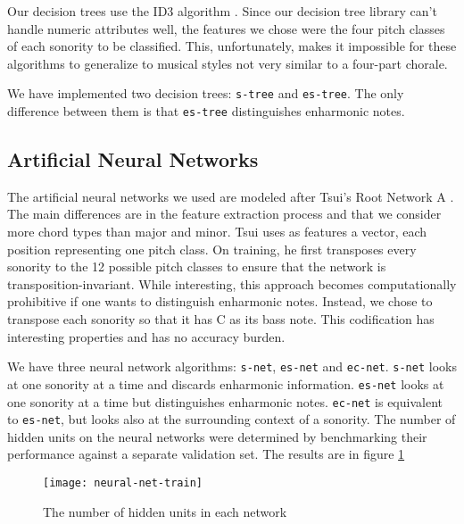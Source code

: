 \documentclass{article}
\newcommand{\comment}[1]{}
\begin{document}
Our decision trees use the ID3 algorithm
\cite{mitchell:machine}. Since our decision tree library can't handle
numeric attributes well, the features we chose were the four pitch
classes of each sonority to be classified. This, unfortunately,
makes it impossible for these algorithms to generalize to musical
styles not very similar to a four-part chorale.

We have implemented two decision trees: \texttt{s-tree} and
\texttt{es-tree}. The only difference between them is that
\texttt{es-tree} distinguishes enharmonic notes.

\subsection{Artificial Neural Networks}
\label{sec:neural-net}

\comment{
  ==> features são weighted pitch counts
  ==> simple/enharmonic-simple/context
  ==> mostrar gráfico de hidden units
}

The artificial neural networks we used are modeled after Tsui's Root
Network A \cite{tsui:harmonic}. The main differences are in the
feature extraction process and that we consider more chord types than
major and minor. Tsui \cite{tsui:harmonic} uses as features a vector,
each position representing one pitch class. On training, he first
transposes every sonority to the 12 possible pitch classes to ensure
that the network is transposition-invariant. While interesting, this
approach becomes computationally prohibitive if one wants to
distinguish enharmonic notes. Instead, we chose to transpose each
sonority so that it has C as its bass note. This codification has
interesting properties and has no accuracy burden.

We have three neural network algorithms: \texttt{s-net},
\texttt{es-net} and \texttt{ec-net}. \texttt{s-net} looks at one
sonority at a time and discards enharmonic information. \texttt{es-net}
looks at one sonority at a time but distinguishes enharmonic
notes. \texttt{ec-net} is equivalent to \texttt{es-net}, but looks
also at the surrounding context of a sonority. The number of hidden
units on the neural networks were determined by benchmarking their
performance against a separate validation set. The results are in
figure \ref{fig:hidden-units}

\begin{figure}
  \centering
  \texttt{[image: neural-net-train]}
  \caption{The number of hidden units in each network}
  \label{fig:hidden-units}
\end{figure}
\end{document}
